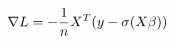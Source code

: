 \documentclass[preview]{standalone}
\begin{document}
\begin{align*}
\special{dvisvgm:raw <g id='unique000'>}\nabla{L}=-\frac{1}{n}X^T(y-\sigma(X\beta))\special{dvisvgm:raw </g>}
\end{align*}
\end{document}
